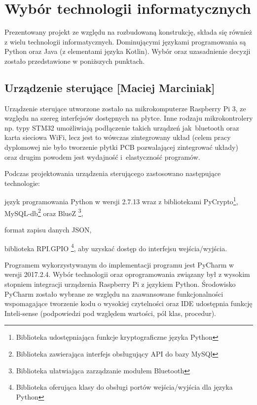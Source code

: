 \documentclass[twoside,10pt]{article}
\begin{document}
\newpage\section{Wybór technologii informatycznych} \label{sec:technologie}
Prezentowany projekt ze względu na rozbudowaną konstrukcję, składa się również z wielu technologii informatycznych. Dominującymi językami programowania są Python oraz Java (z elementami języka Kotlin). Wybór oraz uzasadnienie decyzji zostało przedstawione w poniższych punktach.

\subsection{Urządzenie sterujące [Maciej Marciniak]}
Urządzenie sterujące utworzone zostało na mikrokomputerze Raspberry Pi 3, ze względu na szereg interfejsów dostępnych na płytce. Inne rodzaju mikrokontrolery np. typy STM32 umożliwiają podłączenie takich urządzeń jak~bluetooth oraz karta sieciowa WiFi, lecz jest to wówczas zintegrowany układ (celem pracy dyplomowej nie było tworzenie płytki PCB pozwalającej zintegrować układy) oraz drugim powodem jest wydajność i~elastyczność programów. 

Podczas projektowania urządzenia sterującego zastosowano następujące technologie:
\begin{itemize*}
\item język programowania Python w wersji 2.7.13 wraz z bibliotekami PyCrypto\footnote{ Biblioteka udostępniająca funkcje kryptograficzne języka Python}, MySQL-db\footnote{ Biblioteka zawierająca interfejs obsługujący API do bazy MySQl} oraz BlueZ \footnote{ Biblioteka ułatwiająca zarządzanie modułem Bluetooth },
\item format zapisu danych JSON,
\item biblioteka RPI.GPIO
\footnote{ Biblioteka oferująca klasy do obsługi portów  wejścia/wyjścia dla języka Python}, aby uzyskać dostęp do interfejsu wejścia/wyjścia.
\end{itemize*}

Programem wykorzystywanym do implementacji programu jest PyCharm w wersji 2017.2.4. Wybór technologii oraz oprogramowania związany był z wysokim stopniem integracji urządzenia Raspberry Pi z językiem Python. Środowisko PyCharm zostało wybrane ze względu na zaawansowane funkcjonalności wspomagające tworzenie kodu o wysokiej czytelności oraz IDE udostępnia funkcję Inteli-sense (podpowiedzi pod względem wartości, pól klas, procedur).
\end{document}
